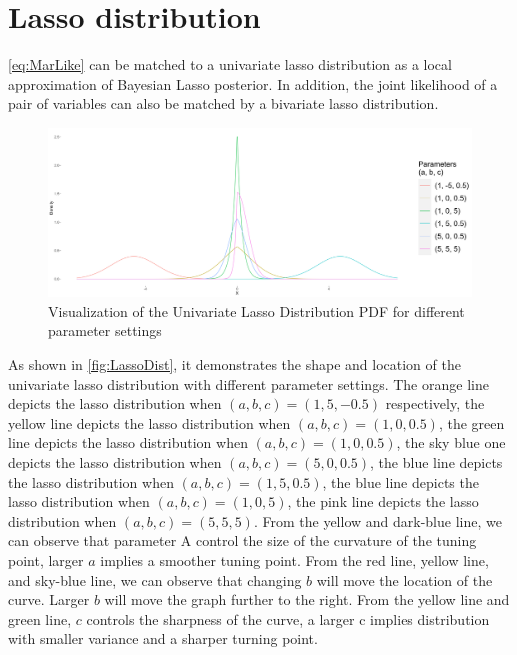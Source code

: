 \section{Lasso distribution}
\autoref{eq:MarLike} can be matched to a univariate lasso distribution as a local approximation of Bayesian Lasso posterior. In addition, the joint likelihood of a pair of variables can also be matched by a bivariate lasso distribution.

\begin{figure}[h]
	\includegraphics[width=\linewidth]{Lasso_distribution}
	\caption{Visualization of the Univariate Lasso Distribution PDF for different parameter settings}
	\label{fig:LassoDist}
\end{figure}
As shown in \autoref{fig:LassoDist},  it demonstrates the shape and location of the univariate lasso distribution with different parameter settings. The orange line depicts the lasso distribution when $(a,b,c) = (1,5,-0.5)$ respectively, the yellow line depicts the lasso distribution when $(a,b,c) = (1,0,0.5)$, the green line depicts the lasso distribution when $(a,b,c) = (1,0,0.5)$, the sky blue one depicts the lasso distribution when $(a,b,c) = (5,0,0.5)$, the blue line depicts the lasso distribution when $(a,b,c) = (1,5,0.5)$, the blue line depicts the lasso distribution when $(a,b,c) = (1,0,5)$, the pink line depicts the lasso distribution when  $(a,b,c) = (5,5,5)$. 
From the yellow and dark-blue line, we can observe that parameter A control the size of the curvature of the tuning point, larger $a$ implies a smoother tuning point.
From the red line, yellow line, and sky-blue line, we can observe that changing $b$ will move the location of the curve. Larger $b$ will move the graph further to the right.
From the yellow line and green line, $c$ controls the sharpness of the curve, a larger c implies distribution with smaller variance and a sharper turning point.


